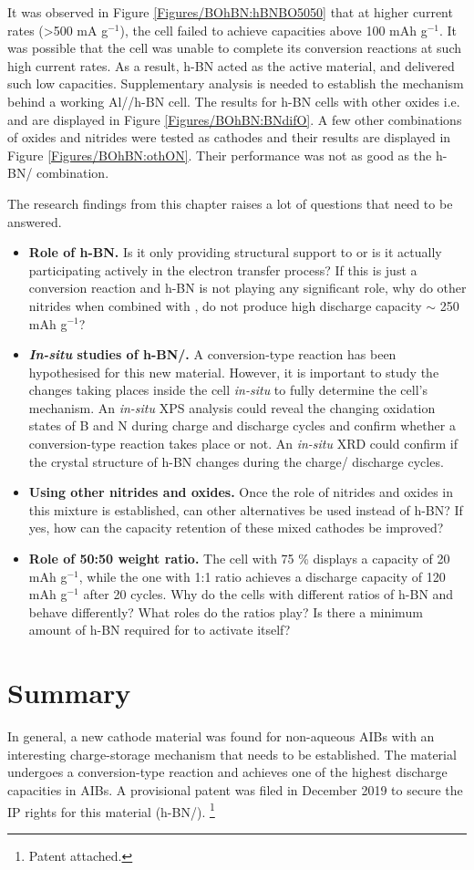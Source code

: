 It was observed in Figure \ref{Figures/BOhBN:hBNBO5050} that at higher current rates (>500 mA g$^{-1}$), the cell failed to achieve capacities above 100 mAh g$^{-1}$. It was possible that the cell was unable to complete its conversion reactions at such high current rates. As a result, h-BN acted as the active material, and delivered such low capacities. Supplementary analysis is needed to establish the mechanism behind a working Al//h-BN cell. The results for h-BN cells with other oxides i.e.  and  are displayed in Figure \ref{Figures/BOhBN:BNdifO}. A few other combinations of oxides and nitrides were tested as cathodes and their results are displayed in Figure \ref{Figures/BOhBN:othON}. Their performance was not as good as the h-BN/  combination.
 
The research findings from this chapter raises a lot of questions that need to be answered.
\begin{itemize}
    \item \textbf{Role of h-BN.} Is it only providing structural support to  or is it actually participating actively in the electron transfer process? If this is just a conversion reaction and h-BN is not playing any significant role, why do other nitrides when combined with , do not produce high discharge capacity $\sim$ 250 mAh g$^{-1}$?
    \item \textbf{\textit{In-situ} studies of h-BN/.} A conversion-type reaction has been hypothesised for this new material. However, it is important to study the changes taking places inside the cell \textit{in-situ} to fully determine the cell's mechanism. An \textit{in-situ} XPS analysis could reveal the changing oxidation states of B and N during charge and discharge cycles and confirm whether a conversion-type reaction takes place or not. An \textit{in-situ} XRD could confirm if the crystal structure of h-BN changes during the charge/ discharge cycles. 
    \item \textbf{Using other nitrides and oxides.} Once the role of nitrides and oxides in this mixture is established, can other alternatives be used instead of h-BN? If yes, how can the capacity retention of these mixed cathodes be improved? 
    \item \textbf{Role of 50:50 weight ratio.} The cell with 75 \%  displays a capacity of 20 mAh g$^{-1}$, while the one with 1:1 ratio achieves a discharge capacity of 120 mAh g$^{-1}$ after 20 cycles. Why do the cells with different ratios of h-BN and  behave differently? What roles do the ratios play? Is there a minimum amount of h-BN required for  to activate itself?  
\end{itemize}
\section{Summary}
In general, a new cathode material was found for non-aqueous AIBs with an interesting charge-storage mechanism that needs to be established. The material undergoes a conversion-type reaction and achieves one of the highest discharge capacities in AIBs. A provisional patent was filed in December 2019 to secure the IP rights for this material (h-BN/). \footnote{Patent attached.}    